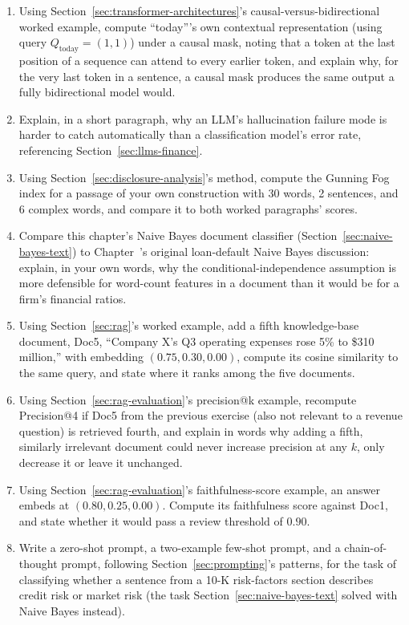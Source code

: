 \documentclass[../ai_in_finance]{subfiles}
\begin{document}
\begin{enumerate}[exercises]
    \item Using Section~\ref{sec:transformer-architectures}'s causal-versus-bidirectional worked example, compute ``today'''s own contextual representation (using query $Q_{\text{today}} = (1,1)$) under a causal mask, noting that a token at the last position of a sequence can attend to every earlier token, and explain why, for the very last token in a sentence, a causal mask produces the same output a fully bidirectional model would.
    \item Explain, in a short paragraph, why an LLM's hallucination failure mode is harder to catch automatically than a classification model's error rate, referencing Section~\ref{sec:llms-finance}.
    \item Using Section~\ref{sec:disclosure-analysis}'s method, compute the Gunning Fog index for a passage of your own construction with 30 words, 2 sentences, and 6 complex words, and compare it to both worked paragraphs' scores.
    \item Compare this chapter's Naive Bayes document classifier (Section~\ref{sec:naive-bayes-text}) to Chapter~'s original loan-default Naive Bayes discussion: explain, in your own words, why the conditional-independence assumption is more defensible for word-count features in a document than it would be for a firm's financial ratios.
    \item Using Section~\ref{sec:rag}'s worked example, add a fifth knowledge-base document, Doc5, ``Company X's Q3 operating expenses rose 5\% to \$310 million,'' with embedding $(0.75, 0.30, 0.00)$, compute its cosine similarity to the same query, and state where it ranks among the five documents.
    \item Using Section~\ref{sec:rag-evaluation}'s precision@k example, recompute Precision@4 if Doc5 from the previous exercise (also not relevant to a revenue question) is retrieved fourth, and explain in words why adding a fifth, similarly irrelevant document could never increase precision at any $k$, only decrease it or leave it unchanged.
    \item Using Section~\ref{sec:rag-evaluation}'s faithfulness-score example, an answer embeds at $(0.80, 0.25, 0.00)$. Compute its faithfulness score against Doc1, and state whether it would pass a review threshold of $0.90$.
    \item Write a zero-shot prompt, a two-example few-shot prompt, and a chain-of-thought prompt, following Section~\ref{sec:prompting}'s patterns, for the task of classifying whether a sentence from a 10-K risk-factors section describes credit risk or market risk (the task Section~\ref{sec:naive-bayes-text} solved with Naive Bayes instead).

\end{enumerate}
\end{document}
